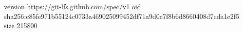 version https://git-lfs.github.com/spec/v1
oid sha256:c85fe971b55124c0733a469025099452df71a9d0c7f8b6d8660408d7cda1c2f5
size 215800
